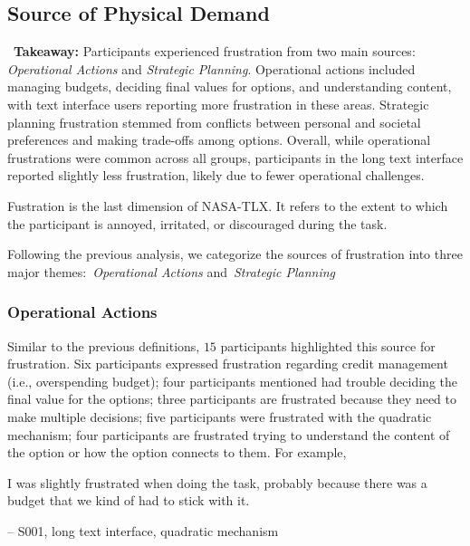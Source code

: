 \subsection{Source of Physical Demand} 
\label{sec:fustration}

\vspace{5pt}
\begin{tldrbox}
    \faInfoCircle~\xspace\textbf{Takeaway:} Participants experienced frustration from two main sources: \textit{Operational Actions} and \textit{Strategic Planning}. Operational actions included managing budgets, deciding final values for options, and understanding content, with text interface users reporting more frustration in these areas. Strategic planning frustration stemmed from conflicts between personal and societal preferences and making trade-offs among options. Overall, while operational frustrations were common across all groups, participants in the long text interface reported slightly less frustration, likely due to fewer operational challenges.
\end{tldrbox}

Fustration is the last dimension of NASA-TLX. It refers to the extent to which the participant is annoyed, irritated, or discouraged during the task.

Following the previous analysis, we categorize the sources of frustration into three major themes:~\textit{Operational Actions} and~\textit{Strategic Planning}

\subsubsection{Operational Actions} Similar to the previous definitions, $15$ participants highlighted this source for frustration. Six participants expressed frustration regarding credit management (i.e., overspending budget); four participants mentioned had trouble deciding the final value for the options; three participants are frustrated because they need to make multiple decisions; five participants were frustrated with the quadratic mechanism; four participants are frustrated trying to understand the content of the option or how the option connects to them. For example, 

\begin{displayquote}
I was slightly frustrated when doing the task, probably because there was a budget that we kind of had to stick with it.

\noindent \hfill -- S001, long text interface, quadratic mechanism
\end{displayquote}


